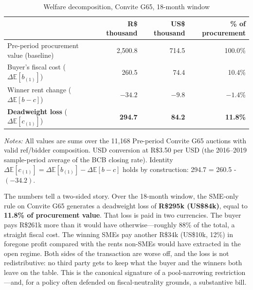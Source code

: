\documentclass[12pt]{article}
\begin{document}
\begin{table}[htbp]
\centering
\caption{Welfare decomposition, Convite G65, 18-month window}
\label{tab:dwl-agg}
\begin{threeparttable}
\small
\setlength{\tabcolsep}{5pt}
\begin{tabular}{lrrr}
\toprule
                                           & R\$ thousand & US\$ thousand & \% of procurement \\
\midrule
Pre-period procurement value (baseline)    & 2{,}500.8    & 714.5          & 100.0\%          \\
\midrule
Buyer's fiscal cost ($\Delta\mathbb{E}[b_{(1)}]$)  & 260.5  & 74.4   & 10.4\%           \\
Winner rent change ($\Delta\mathbb{E}[b-c]$)       & $-34.2$ & $-9.8$ & $-1.4$\%         \\
\midrule
\textbf{Deadweight loss} ($\Delta\mathbb{E}[c_{(1)}]$) & \textbf{294.7} & \textbf{84.2} & \textbf{11.8\%} \\
\bottomrule
\end{tabular}
\begin{tablenotes}
\footnotesize
\item \textit{Notes:} All values are sums over the 11{,}168 Pre-period
Convite G65 auctions with valid ref/bidder composition. USD conversion
at R\$3.50 per USD (the 2016--2019 sample-period average of the BCB
closing rate). Identity
$\Delta\mathbb{E}[c_{(1)}] = \Delta\mathbb{E}[b_{(1)}]
- \Delta\mathbb{E}[b - c]$
holds by construction: 294.7 = 260.5 - $(-34.2)$.
\end{tablenotes}
\end{threeparttable}
\end{table}

The numbers tell a two-sided story. Over the 18-month window, the
SME-only rule on Convite G65 generates a deadweight loss of
\textbf{R\$295k (US\$84k)}, equal to \textbf{11.8\% of procurement
value}. That loss is paid in two currencies. The buyer pays
R\$261k more than it would have otherwise---roughly 88\% of the
total, a straight fiscal cost. The winning SMEs pay another R\$34k
(US\$10k, 12\%) in foregone profit compared with the rents non-SMEs
would have extracted in the open regime. Both sides of the
transaction are worse off, and the loss is not redistributive:
no third party gets to keep what the buyer and the winners both
leave on the table. This is the canonical signature of a
pool-narrowing restriction---and, for a policy often defended on
fiscal-neutrality grounds, a substantive bill.
\end{document}
